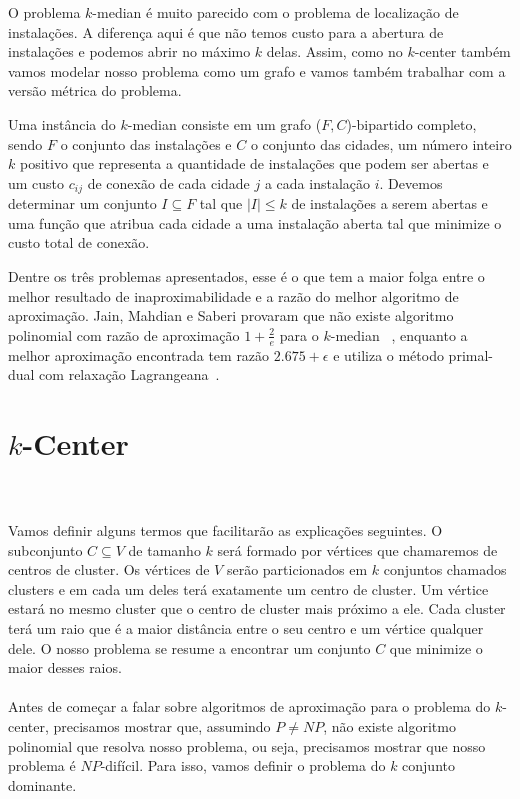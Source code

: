 \documentclass[12pt]{article}
\newcommand{\NP}{\mathit{NP}}
\newcommand{\red}[1]{{\color{red}{#1}}}
\begin{document}
O problema $k$-median é muito parecido com o problema de localização de instalações. A diferença aqui é que não temos custo para a abertura de instalações e podemos abrir no máximo $k$ delas. Assim, como no $k$-center também vamos modelar nosso problema como um grafo e vamos também trabalhar com a versão métrica do problema.

Uma instância do $k$-median consiste em um grafo ($F,C$)-bipartido completo, sendo $F$ o conjunto das instalações e $C$ o conjunto das cidades, um número inteiro $k$ positivo que representa a quantidade de instalações que podem ser abertas e um custo $c_{ij}$ de conexão de cada cidade $j$ a cada instalação $i$. Devemos determinar um conjunto $I \subseteq F$ tal que $|I| \leq k$ de instalações a serem abertas e uma função que atribua cada cidade a uma instalação aberta tal que minimize o custo total de conexão.

Dentre os três problemas apresentados, esse é o que tem a maior folga entre o melhor resultado de inaproximabilidade e a razão do melhor algoritmo de aproximação. Jain, Mahdian e Saberi provaram que não existe algoritmo polinomial com razão de aproximação $1+ \frac{2}{e}$ para o $k$-median ~\cite{JMS'02}, enquanto a melhor aproximação encontrada tem razão $2.675 + \epsilon$ e utiliza o método primal-dual com relaxação Lagrangeana~\cite{BPRST'17}.

\newpage
\section{$k$-Center}

\red{É bom definir o problema novamente?.}\\
\red{Falar sobre cada cluster, centros de cluster, raio. Facilitará nas explicações seguintes.}\\
Vamos definir alguns termos que facilitarão as explicações seguintes. O subconjunto $C \subseteq V$ de tamanho $k$ será formado por vértices que chamaremos de centros de cluster. Os vértices de $V$ serão particionados em $k$ conjuntos chamados clusters e em cada um deles terá exatamente um centro de cluster. Um vértice estará no mesmo cluster que o centro de cluster mais próximo a ele. Cada cluster terá um raio que é a maior distância entre o seu centro e um vértice qualquer dele. O nosso problema se resume a encontrar um conjunto $C$ que minimize o maior desses raios.\\
\red{Mostrar que é NP-difícil.} \\
Antes de começar a falar sobre algoritmos de aproximação para o problema do $k$-center, precisamos mostrar que, assumindo $P\not=\NP$, não existe algoritmo polinomial que resolva nosso problema, ou seja, precisamos mostrar que nosso problema é $\NP$-difícil. Para isso, vamos definir o problema do $k$ conjunto dominante.
\end{document}
